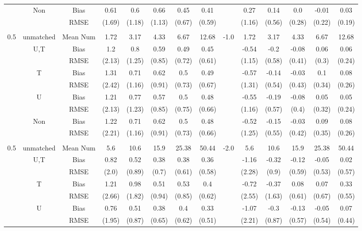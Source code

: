 \begin{tabular}{@{\extracolsep{5pt}}lc|cccccc|lccccc}
 & Non & Bias & 0.61 & 0.6 & 0.66 & 0.45 & 0.41 &  & 0.27 & 0.14 & 0.0 & -0.01 & 0.03 \\
 &  & RMSE & (1.69) & (1.18) & (1.13) & (0.67) & (0.59) &  & (1.16) & (0.56) & (0.28) & (0.22) & (0.19) \\
 &  &  &  &  &  &  &  &  &  &  &  &  &  \\
0.5 & unmatched & Mean Num & 1.72 & 3.17 & 4.33 & 6.67 & 12.68 & -1.0 & 1.72 & 3.17 & 4.33 & 6.67 & 12.68 \\
 & U,T & Bias & 1.2 & 0.8 & 0.59 & 0.49 & 0.45 &  & -0.54 & -0.2 & -0.08 & 0.06 & 0.06 \\
 &  & RMSE & (2.13) & (1.25) & (0.85) & (0.72) & (0.61) &  & (1.15) & (0.58) & (0.41) & (0.3) & (0.24) \\
 & T & Bias & 1.31 & 0.71 & 0.62 & 0.5 & 0.49 &  & -0.57 & -0.14 & -0.03 & 0.1 & 0.08 \\
 &  & RMSE & (2.42) & (1.16) & (0.91) & (0.73) & (0.67) &  & (1.31) & (0.54) & (0.43) & (0.34) & (0.26) \\
 & U & Bias & 1.21 & 0.77 & 0.57 & 0.5 & 0.48 &  & -0.55 & -0.19 & -0.08 & 0.05 & 0.05 \\
 &  & RMSE & (2.13) & (1.23) & (0.85) & (0.75) & (0.66) &  & (1.16) & (0.57) & (0.4) & (0.32) & (0.24) \\
 & Non & Bias & 1.22 & 0.71 & 0.62 & 0.5 & 0.48 &  & -0.52 & -0.15 & -0.03 & 0.09 & 0.08 \\
 &  & RMSE & (2.21) & (1.16) & (0.91) & (0.73) & (0.66) &  & (1.25) & (0.55) & (0.42) & (0.35) & (0.26) \\
 &  &  &  &  &  &  &  &  &  &  &  &  &  \\
0.5 & unmatched & Mean Num & 5.6 & 10.6 & 15.9 & 25.38 & 50.44 & -2.0 & 5.6 & 10.6 & 15.9 & 25.38 & 50.44 \\
 & U,T & Bias & 0.82 & 0.52 & 0.38 & 0.38 & 0.36 &  & -1.16 & -0.32 & -0.12 & -0.05 & 0.02 \\
 &  & RMSE & (2.0) & (0.89) & (0.7) & (0.61) & (0.58) &  & (2.28) & (0.9) & (0.59) & (0.53) & (0.57) \\
 & T & Bias & 1.21 & 0.98 & 0.51 & 0.53 & 0.4 &  & -0.72 & -0.37 & 0.08 & 0.07 & 0.33 \\
 &  & RMSE & (2.66) & (1.82) & (0.94) & (0.85) & (0.62) &  & (2.55) & (1.63) & (0.61) & (0.67) & (0.55) \\
 & U & Bias & 0.76 & 0.51 & 0.38 & 0.4 & 0.33 &  & -1.07 & -0.3 & -0.13 & -0.05 & 0.07 \\
 &  & RMSE & (1.95) & (0.87) & (0.65) & (0.62) & (0.51) &  & (2.21) & (0.87) & (0.57) & (0.54) & (0.44) \\

\end{tabular}
